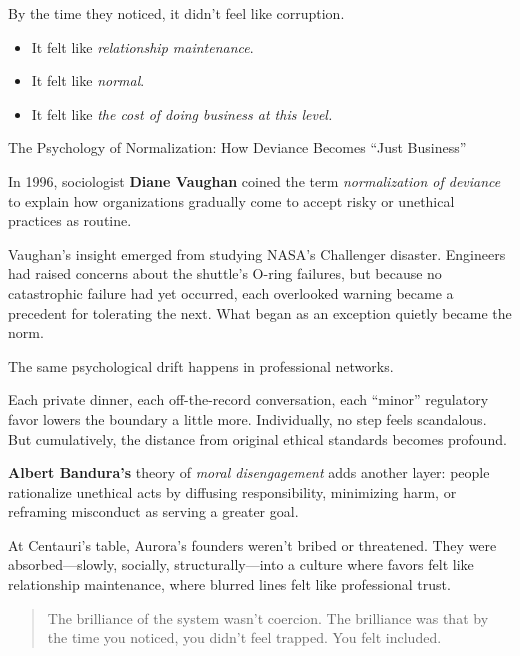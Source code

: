 By the time they noticed, it didn’t feel like corruption.  

\begin{itemize}
  \item It felt like \textit{relationship maintenance}.  
  \item It felt like \textit{normal}.  
  \item It felt like \textit{the cost of doing business at this level.}
\end{itemize}

\begin{PsychologySidebar}{The Psychology of Normalization: How Deviance Becomes “Just Business”}

  In 1996, sociologist \textbf{Diane Vaughan} coined the term \emph{normalization of deviance} to explain how organizations gradually come to accept risky or unethical practices as routine.

  \medskip
  
  Vaughan’s insight emerged from studying NASA’s Challenger disaster. Engineers had raised concerns about the shuttle’s O-ring failures, but because no catastrophic failure had yet occurred, each overlooked warning became a precedent for tolerating the next. What began as an exception quietly became the norm.

  \medskip
  
  The same psychological drift happens in professional networks.

  \medskip
  
  Each private dinner, each off-the-record conversation, each “minor” regulatory favor lowers the boundary a little more. Individually, no step feels scandalous. But cumulatively, the distance from original ethical standards becomes profound.

  \medskip
  
  \textbf{Albert Bandura’s} theory of \emph{moral disengagement} adds another layer: people rationalize unethical acts by diffusing responsibility, minimizing harm, or reframing misconduct as serving a greater goal.

  \medskip
  
  At Centauri’s table, Aurora’s founders weren’t bribed or threatened. They were absorbed—slowly, socially, structurally—into a culture where favors felt like relationship maintenance, where blurred lines felt like professional trust.
  
  \begin{quote}
  The brilliance of the system wasn’t coercion.  The brilliance was that by the time you noticed, you didn’t feel trapped.  You felt included.
  \end{quote}
  
\end{PsychologySidebar}


